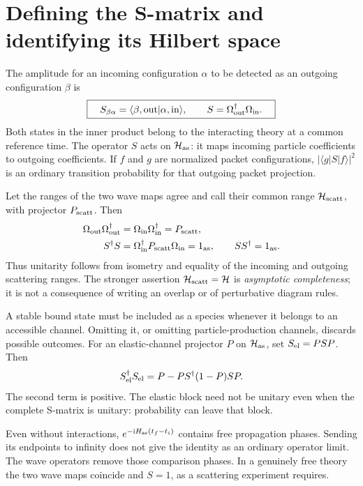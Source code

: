 \documentclass[11pt]{article}
\newcommand{\ii}{\mathrm i}
\newcommand{\module}[1]{\clearpage\section{#1}}
\newcommand{\cH}{\mathcal H}
\begin{document}
\module{Defining the S-matrix and identifying its Hilbert space}
The amplitude for an incoming configuration \(\alpha\) to be detected as
an outgoing configuration \(\beta\) is
\begin{equation}
 \boxed{\quad S_{\beta\alpha}=\langle\beta,\mathrm{out}|\alpha,\mathrm{in}\rangle,
 \qquad S=\Omega_{\rm out}^\dagger\Omega_{\rm in}.\quad}
 \label{eq:S}
\end{equation}
Both states in the inner product belong to the interacting theory at a
common reference time. The operator \(S\) acts on \(\cH_{\rm as}\): it maps
incoming particle coefficients to outgoing coefficients. If \(f\) and
\(g\) are normalized packet configurations, \(|\langle g|S|f\rangle|^2\)
is an ordinary transition probability for that outgoing packet projection.

Let the ranges of the two wave maps agree and call their common range
\(\cH_{\rm scatt}\), with projector \(P_{\rm scatt}\). Then
\begin{align}
 \Omega_{\rm out}\Omega_{\rm out}^\dagger
 &=\Omega_{\rm in}\Omega_{\rm in}^\dagger=P_{\rm scatt},\\
 S^\dagger S
 &=\Omega_{\rm in}^\dagger P_{\rm scatt}\Omega_{\rm in}=1_{\rm as},
 \qquad SS^\dagger=1_{\rm as}.
 \label{eq:unitarity}
\end{align}
Thus unitarity follows from isometry and equality of the incoming and
outgoing scattering ranges. The stronger assertion
\(\cH_{\rm scatt}=\cH\) is \emph{asymptotic completeness}; it is not a
consequence of writing an overlap or of perturbative diagram rules.

A stable bound state must be included as a species whenever it belongs
to an accessible channel. Omitting it, or omitting particle-production
channels, discards possible outcomes. For an elastic-channel projector
\(P\) on \(\cH_{\rm as}\), set \(S_{\rm el}=PSP\). Then
\begin{equation}
 S_{\rm el}^\dagger S_{\rm el}
 =P-PS^\dagger(1-P)SP.
\end{equation}
The second term is positive. The elastic block need not be unitary even
when the complete S-matrix is unitary: probability can leave that block.

\begin{remarkbox}
Even without interactions, \(e^{-\ii H_{\rm as}(t_f-t_i)}\) contains free
propagation phases. Sending its endpoints to infinity does not give the
identity as an ordinary operator limit. The wave operators remove those
comparison phases. In a genuinely free theory the two wave maps coincide
and \(S=1\), as a scattering experiment requires.
\end{remarkbox}
\end{document}

